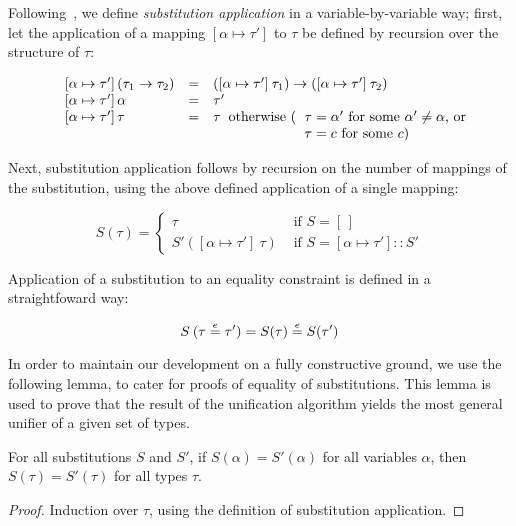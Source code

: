 Following~, we define {\em substitution
  application\/} in a variable-by-variable way; first, let the
application of a mapping $[\alpha\mapsto\tau']$ to $\tau$ be defined
by recursion over the structure of $\tau$:

\[ \begin{array}[t]{llp{.5\textwidth}}
      \symbol{91}\alpha\mapsto \tau'\symbol{93}\,(\tau_1\rightarrow \tau_2) & = & 
        $([\alpha\mapsto \tau']\:\tau_1) \to ([\alpha \mapsto \tau']\:\tau_2)$ \\
      \symbol{91}\alpha\mapsto \tau'\symbol{93}\,\alpha & = & $\tau'$ \\
      \symbol{91}\alpha\mapsto \tau'\symbol{93}\,\tau   & = & $\tau$ 
        \text{ otherwise (\begin{tabular}[t]{l}
                                  $\tau = \alpha'$ for some $\alpha'\not=\alpha$, or \\
                                  $\tau = c$ for some $c$)
                          \end{tabular}}
   \end{array}
\]

Next, substitution application follows by recursion on the number of
mappings of the substitution, using the above defined application of a
single mapping:

\[
   S(\tau) = \left\{
             \begin{array}{ll}
               \tau & \text{ if } S = [\,]\\
              S'([\alpha\mapsto\tau']\:\tau) & \text{ if }S = [\alpha\mapsto\tau'] :: S'
             \end{array}
           \right.
\]

Application of a substitution to an equality constraint is defined in
a straightfoward way:

\[ S\:(\tau\overset{e}{=} \tau') = S(\tau)\overset{e}{=} S(\tau') \]

In order to maintain our development on a fully constructive ground,
we use the following lemma, to cater for proofs of equality of
substitutions. This lemma is used to prove that the result of the
unification algorithm yields the most general unifier of a given set
of types.

\begin{Lemma}\label{extsubst}
For all substitutions $S$ and $S'$, if $S(\alpha)=S'(\alpha)$ for all
variables $\alpha$, then $S(\tau) = S'(\tau)$ for all types $\tau$.
\end{Lemma}
\begin{proof}
Induction over $\tau$, using the definition of substitution
application.
\end{proof}

